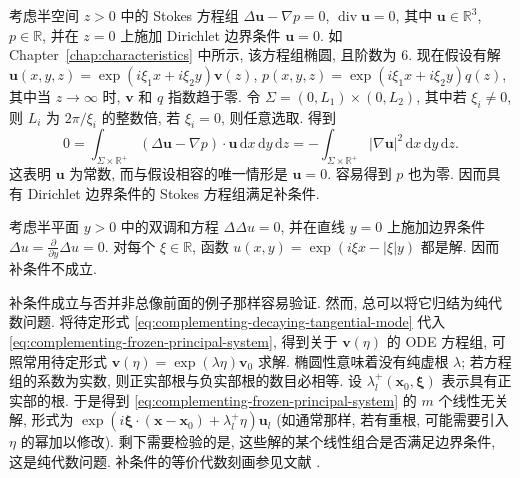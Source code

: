 \begin{Example}
\label{ex:stokes-dirichlet-complementing-condition}
考虑半空间 $z>0$ 中的 Stokes 方程组 $\Delta\bm{u}-\nabla p=0$, $\operatorname{div}\bm{u}=0$, 其中 $\bm{u}\in\mathbb{R}^3$, $p\in\mathbb{R}$, 并在 $z=0$ 上施加 Dirichlet 边界条件 $\bm{u}=0$. 如 Chapter~\ref{chap:characteristics} 中所示, 该方程组椭圆, 且阶数为 $6$. 现在假设有解 $\bm{u}(x,y,z)=\exp(i\xi_1x+i\xi_2y)\bm{v}(z)$, $p(x,y,z)=\exp(i\xi_1x+i\xi_2y)q(z)$, 其中当 $z\to\infty$ 时, $\bm{v}$ 和 $q$ 指数趋于零. 令 $\Sigma=(0,L_1)\times(0,L_2)$, 其中若 $\xi_i\ne0$, 则 $L_i$ 为 $2\pi/\xi_i$ 的整数倍, 若 $\xi_i=0$, 则任意选取. 得到
\begin{equation}\label{eq:stokes-complementing-periodic-energy-identity}
0=\int_{\Sigma\times\mathbb{R}^+}(\Delta\bm{u}-\nabla p)\cdot\bm{u}\,\mathrm{d}x\,\mathrm{d}y\,\mathrm{d}z=-\int_{\Sigma\times\mathbb{R}^+}|\nabla\bm{u}|^2\,\mathrm{d}x\,\mathrm{d}y\,\mathrm{d}z.
\end{equation}
这表明 $\bm{u}$ 为常数, 而与假设相容的唯一情形是 $\bm{u}=0$. 容易得到 $p$ 也为零. 因而具有 Dirichlet 边界条件的 Stokes 方程组满足补条件.
\end{Example}

\begin{Example}
\label{ex:biharmonic-noncomplementing-boundary-condition}
考虑半平面 $y>0$ 中的双调和方程 $\Delta\Delta u=0$, 并在直线 $y=0$ 上施加边界条件 $\Delta u=\frac{\partial}{\partial y}\Delta u=0$. 对每个 $\xi\in\mathbb{R}$, 函数 $u(x,y)=\exp(i\xi x-|\xi|y)$ 都是解. 因而补条件不成立.
\end{Example}

补条件成立与否并非总像前面的例子那样容易验证. 然而, 总可以将它归结为纯代数问题. 将待定形式 \eqref{eq:complementing-decaying-tangential-mode} 代入 \eqref{eq:complementing-frozen-principal-system}, 得到关于 $\bm{v}(\eta)$ 的 ODE 方程组, 可照常用待定形式 $\bm{v}(\eta)=\exp(\lambda\eta)\bm{v}_0$ 求解. 椭圆性意味着没有纯虚根 $\lambda$; 若方程组的系数为实数, 则正实部根与负实部根的数目必相等. 设 $\lambda_l^+(\bm{x}_0,\bm{\xi})$ 表示具有正实部的根. 于是得到 \eqref{eq:complementing-frozen-principal-system} 的 $m$ 个线性无关解, 形式为 $\exp(i\bm{\xi}\cdot(\bm{x}-\bm{x}_0)+\lambda_l^+\eta)\bm{u}_l$ (如通常那样, 若有重根, 可能需要引入 $\eta$ 的幂加以修改). 剩下需要检验的是, 这些解的某个线性组合是否满足边界条件, 这是纯代数问题. 补条件的等价代数刻画参见文献 \cite{ADN2}.
